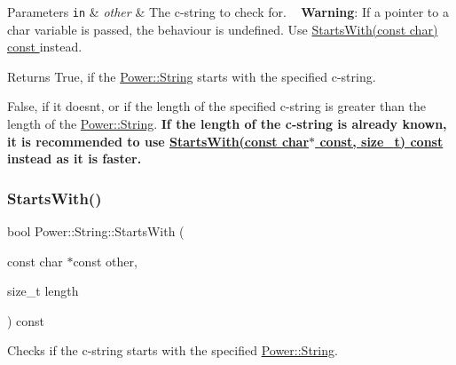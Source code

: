 \begin{DoxyParams}[1]{Parameters}
\mbox{\tt in}  & {\em other} & The c-\/string to check for. ~\newline
 {\bfseries Warning}\+: If a pointer to a char variable is passed, the behaviour is undefined. Use \hyperlink{class_power_1_1_string_a7c32b540950bc8b7061751333ec8ef17}{Starts\+With(const char) const }instead. \\
\hline
\end{DoxyParams}
\begin{DoxyReturn}{Returns}
True, if the \hyperlink{class_power_1_1_string}{Power\+::\+String} starts with the specified c-\/string. 

False, if it doesn\textquotesingle{}t, or if the length of the specified c-\/string is greater than the length of the \hyperlink{class_power_1_1_string}{Power\+::\+String}.  {\bfseries If the length of the c-\/string is already known, it is recommended to use \hyperlink{class_power_1_1_string_a5f0999383b26616b84abe75a4ea8a185}{Starts\+With(const char$\ast$ const, size\+\_\+t) const }instead as it is faster.} 
\end{DoxyReturn}
\mbox{\label{class_power_1_1_string_a5f0999383b26616b84abe75a4ea8a185}} 
\subsubsection{\texorpdfstring{Starts\+With()}{StartsWith()}\hspace{0.1cm}{\footnotesize\ttfamily [3/4]}}
{\footnotesize\ttfamily bool Power\+::\+String\+::\+Starts\+With (\begin{DoxyParamCaption}\item[{const char $\ast$const}]{other,  }\item[{size\+\_\+t}]{length }\end{DoxyParamCaption}) const\hspace{0.3cm}{\ttfamily [inline]}}



Checks if the c-\/string starts with the specified \hyperlink{class_power_1_1_string}{Power\+::\+String}. 


